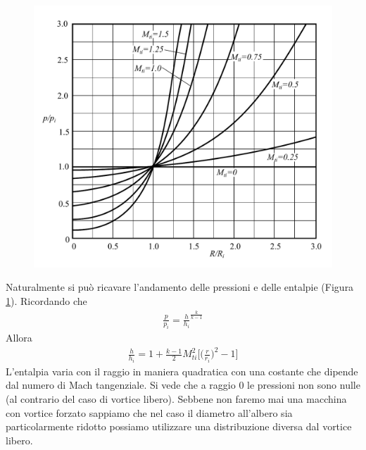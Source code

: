 \begin{figure}
\centering
  \includegraphics[width=.8\textwidth]{fig/PVortForz.pdf}
\caption{}
\label{fig:PVortForz}
\end{figure}
Naturalmente si può ricavare l'andamento delle pressioni e delle entalpie (Figura \ref{fig:PVortForz}). Ricordando che
\begin{align*}
\frac{p}{p_i} = \frac{h}{h_i}^{\frac{k}{k-1}}
\end{align*}
Allora
\begin{align*}
\frac{h}{h_i} = 1 + \frac{k-1}{2} M_{ti}^2 \bigg[ \bigg(\frac{r}{r_i} \bigg)^2-1 \bigg]
\end{align*}
L'entalpia varia con il raggio in maniera quadratica con una costante che dipende dal numero di Mach tangenziale. Si vede che a raggio $0$ le pressioni non sono nulle (al contrario del caso di vortice libero). Sebbene non faremo mai una macchina con vortice forzato sappiamo che nel caso il diametro all'albero sia particolarmente ridotto possiamo utilizzare una distribuzione diversa dal vortice libero. 

